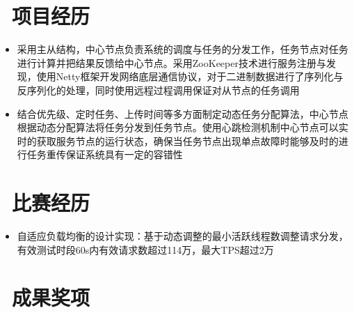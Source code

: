 \documentclass{resume}
\begin{document}
\section{\faInbox\ 项目经历}

\begin{onehalfspacing}
\begin{itemize}
  \item 采用主从结构，中心节点负责系统的调度与任务的分发工作，任务节点对任务进行计算并把结果反馈给中心节点。采用ZooKeeper技术进行服务注册与发现，使用Netty框架开发网络底层通信协议，对于二进制数据进行了序列化与反序列化的处理，同时使用远程过程调用保证对从节点的任务调用
  \item 结合优先级、定时任务、上传时间等多方面制定动态任务分配算法，中心节点根据动态分配算法将任务分发到任务节点。使用心跳检测机制中心节点可以实时的获取服务节点的运行状态，确保当任务节点出现单点故障时能够及时的进行任务重传保证系统具有一定的容错性
\end{itemize}
\end{onehalfspacing}

\section{\faPaperPlaneO\ 比赛经历}
\begin{onehalfspacing}
\begin{itemize}
  \item 自适应负载均衡的设计实现：基于动态调整的最小活跃线程数调整请求分发，有效测试时段60s内有效请求数超过114万，最大TPS超过2万
\end{itemize}
\end{onehalfspacing}

\section{\faStar\ 成果奖项}
\end{document}

